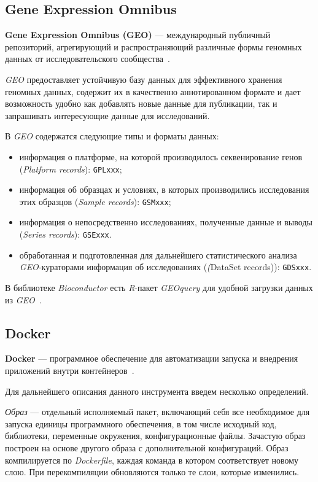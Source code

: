 \documentclass[annotation,specification]{itmo-student-thesis}
\begin{document}
\subsection{Gene Expression Omnibus}
\textbf{Gene Expression Omnibus (GEO)} --- международный публичный репозиторий, агрегирующий и распространяющий различные формы геномных данных от исследовательского сообщества~\cite{geo}.

\emph{GEO} предоставляет устойчивую базу данных для эффективного хранения геномных данных, содержит их в качественно аннотированном формате и дает возможность удобно как добавлять новые данные для публикации, так и запрашивать интересующие данные для исследований.

В \emph{GEO} содержатся следующие типы и форматы данных:
\begin{itemize}
\item информация о платформе, на которой производилось секвенирование генов (\emph{Platform records}): \texttt{GPLxxx};
\item информация об образцах и условиях, в которых производились исследования этих образцов (\emph{Sample records}): \texttt{GSMxxx};
\item информация о непосредственно исследованиях, полученные данные и выводы (\emph{Series records}): \texttt{GSExxx}.
\item обработанная и подготовленная для дальнейшего статистического анализа \emph{GEO}-кураторами информация об исследованиях (\emph(DataSet records)): \texttt{GDSxxx}.
\end{itemize}

В библиотеке \emph{Bioconductor} есть \emph{R}-пакет \emph{GEOquery} для удобной загрузки данных из \emph{GEO}~\cite{geoquery}.

\subsection{Docker}
\textbf{Docker} --- программное обеспечение для автоматизации запуска и внедрения приложений внутри контейнеров~\cite{docker}.

Для дальнейшего описания данного инструмента введем несколько определений.

\textit{Образ} --- отдельный исполняемый пакет, включающий себя все необходимое для запуска единицы программного обеспечения, в том числе исходный код, библиотеки, переменные окружения, конфигурационные файлы. Зачастую образ построен на основе другого образа с дополнительной конфигураций. Образ компилируется по \textit{Dockerfile}, каждая команда в котором соответствует новому слою. При перекомпиляции обновляются только те слои, которые изменились. 
\end{document}
